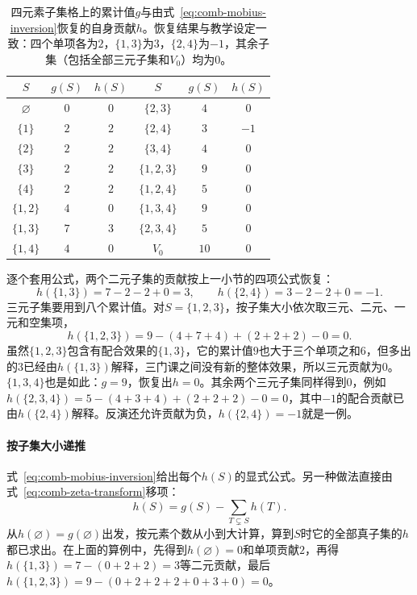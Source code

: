\begin{table}[!htb]
  \centering
  \begin{tabular}{ccc@{\qquad}ccc}
    \toprule
    $S$ & $g(S)$ & $h(S)$ & $S$ & $g(S)$ & $h(S)$ \\
    \midrule
    $\varnothing$ & $0$ & $0$ & $\{2,3\}$ & $4$ & $0$ \\
    $\{1\}$ & $2$ & $2$ & $\{2,4\}$ & $3$ & $-1$ \\
    $\{2\}$ & $2$ & $2$ & $\{3,4\}$ & $4$ & $0$ \\
    $\{3\}$ & $2$ & $2$ & $\{1,2,3\}$ & $9$ & $0$ \\
    $\{4\}$ & $2$ & $2$ & $\{1,2,4\}$ & $5$ & $0$ \\
    $\{1,2\}$ & $4$ & $0$ & $\{1,3,4\}$ & $9$ & $0$ \\
    $\{1,3\}$ & $7$ & $3$ & $\{2,3,4\}$ & $5$ & $0$ \\
    $\{1,4\}$ & $4$ & $0$ & $V_0$ & $10$ & $0$ \\
    \bottomrule
  \end{tabular}
  \caption{四元素子集格上的累计值$g$与由式~\eqref{eq:comb-mobius-inversion}恢复的自身贡献$h$。恢复结果与教学设定一致：四个单项各为$2$，$\{1,3\}$为$3$，$\{2,4\}$为$-1$，其余子集（包括全部三元子集和$V_0$）均为$0$。}
  \label{tab:comb-four-element-mobius}
\end{table}

逐个套用公式，两个二元子集的贡献按上一小节的四项公式恢复：
\[
  h(\{1,3\})=7-2-2+0=3,\qquad h(\{2,4\})=3-2-2+0=-1.
\]
三元子集要用到八个累计值。对$S=\{1,2,3\}$，按子集大小依次取三元、二元、一元和空集项，
\[
  h(\{1,2,3\})=9-(4+7+4)+(2+2+2)-0=0.
\]
虽然$\{1,2,3\}$包含有配合效果的$\{1,3\}$，它的累计值$9$也大于三个单项之和$6$，但多出的$3$已经由$h(\{1,3\})$解释，三门课之间没有新的整体效果，所以三元贡献为$0$。$\{1,3,4\}$也是如此：$g=9$，恢复出$h=0$。其余两个三元子集同样得到$0$，例如$h(\{2,3,4\})=5-(4+3+4)+(2+2+2)-0=0$，其中$-1$的配合贡献已由$h(\{2,4\})$解释。反演还允许贡献为负，$h(\{2,4\})=-1$就是一例。

\paragraph{按子集大小递推}
式~\eqref{eq:comb-mobius-inversion}给出每个$h(S)$的显式公式。另一种做法直接由式~\eqref{eq:comb-zeta-transform}移项：
\[
  h(S)=g(S)-\sum_{T\subsetneq S}h(T).
\]
从$h(\varnothing)=g(\varnothing)$出发，按元素个数从小到大计算，算到$S$时它的全部真子集的$h$都已求出。在上面的算例中，先得到$h(\varnothing)=0$和单项贡献$2$，再得$h(\{1,3\})=7-(0+2+2)=3$等二元贡献，最后$h(\{1,2,3\})=9-(0+2+2+2+0+3+0)=0$。

